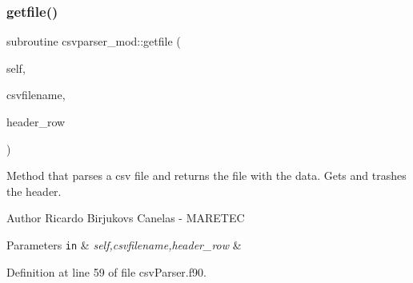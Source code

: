 \subsubsection{\texorpdfstring{getfile()}{getfile()}}
{\footnotesize\ttfamily subroutine csvparser\+\_\+mod\+::getfile (\begin{DoxyParamCaption}\item[{class(\mbox{\hyperlink{structcsvparser__mod_1_1csvparser__class}{csvparser\+\_\+class}}), intent(inout)}]{self,  }\item[{type(string), intent(in)}]{csvfilename,  }\item[{integer, intent(in)}]{header\+\_\+row }\end{DoxyParamCaption})\hspace{0.3cm}{\ttfamily [private]}}



Method that parses a csv file and returns the file with the data. Gets and trashes the header. 

\begin{DoxyAuthor}{Author}
Ricardo Birjukovs Canelas -\/ M\+A\+R\+E\+T\+EC 
\end{DoxyAuthor}

\begin{DoxyParams}[1]{Parameters}
\mbox{\tt in}  & {\em self,csvfilename,header\+\_\+row} & \\
\hline
\end{DoxyParams}


Definition at line 59 of file csv\+Parser.\+f90.


